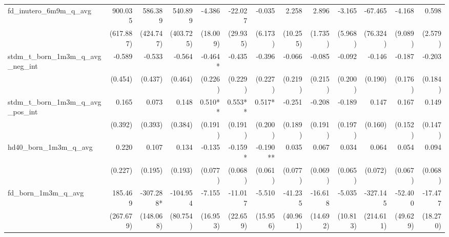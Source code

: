 \begin{tabular}{lrrrrrrrrrrrr}
fd\_inutero\_6m9m\_q\_avg                   &      900.035 &      586.389 &      540.899 &       -4.386 &      -22.027 &       -0.035 &        2.258 &        2.896 &       -3.165 &      -67.465 &       -4.168 &        0.598 \\ 
                                            &    (617.887) &    (424.747) &    (403.725) &     (18.009) &     (29.935) &      (6.173) &     (10.255) &      (1.735) &      (5.968) &     (76.324) &      (9.089) &      (2.579) \\ 
stdm\_t\_born\_1m3m\_q\_avg\_neg\_int       &       -0.589 &       -0.533 &       -0.564 &      -0.464* &       -0.435 &       -0.396 &       -0.066 &       -0.085 &       -0.092 &       -0.146 &       -0.187 &       -0.203 \\ 
                                            &      (0.454) &      (0.437) &      (0.464) &      (0.226) &      (0.229) &      (0.227) &      (0.219) &      (0.215) &      (0.200) &      (0.190) &      (0.176) &      (0.184) \\ 
stdm\_t\_born\_1m3m\_q\_avg\_pos\_int       &        0.165 &        0.073 &        0.148 &      0.510** &      0.553** &       0.517* &       -0.251 &       -0.208 &       -0.189 &        0.147 &        0.167 &        0.149 \\ 
                                            &      (0.392) &      (0.393) &      (0.384) &      (0.191) &      (0.191) &      (0.200) &      (0.189) &      (0.191) &      (0.197) &      (0.160) &      (0.152) &      (0.147) \\ 
hd40\_born\_1m3m\_q\_avg                    &        0.220 &        0.107 &        0.134 &       -0.135 &      -0.159* &     -0.190** &        0.035 &        0.067 &        0.034 &        0.064 &        0.054 &        0.094 \\ 
                                            &      (0.227) &      (0.195) &      (0.193) &      (0.077) &      (0.068) &      (0.061) &      (0.077) &      (0.069) &      (0.065) &      (0.072) &      (0.067) &      (0.068) \\ 
fd\_born\_1m3m\_q\_avg                      &      185.469 &    -307.288* &     -104.954 &       -7.155 &      -11.017 &       -5.510 &      -41.235 &      -16.618 &       -5.035 &     -327.145 &      -52.400 &      -17.477 \\ 
                                            &    (267.679) &    (148.068) &     (80.754) &     (16.953) &     (22.659) &     (15.956) &     (40.961) &     (14.692) &     (10.813) &    (214.611) &     (49.629) &     (18.270) \\ 

\end{tabular}
